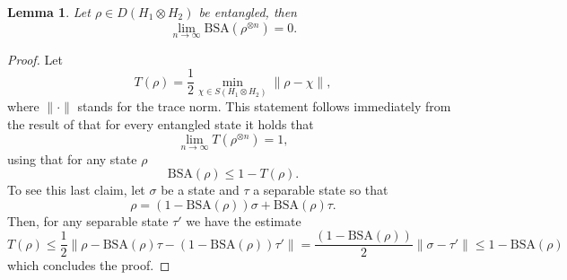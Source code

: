 \documentclass[a4paper,onecolumn,accepted=2024-12-14]{quantumarticle}
\newtheorem{lemma}[theorem]{Lemma}
\theoremstyle{plain}
\begin{document}
\begin{lemma}\label{lem:tensor-bsa}
Let $\rho\in D(H_1\otimes H_2)$ be entangled, then
\begin{equation}
\lim_{n\to\infty}\mathrm{BSA}\left(\rho^{\otimes n}\right)=0.
\end{equation}
\end{lemma}
\begin{proof}
Let
\begin{equation}
T(\rho)=\frac{1}{2}\min_{\chi\in S(H_1\otimes H_2)}\|\rho-\chi\|,
\end{equation}
where $\|\cdot\|$ stands for the trace norm. This statement follows immediately from the result of \cite{beigi} that for every entangled state it holds that
\begin{equation}
\lim_{n\to\infty}T\left(\rho^{\otimes n}\right)=1,
\end{equation}
using that for any state $\rho$
\begin{equation}\label{bsadistance}
\mathrm{BSA}(\rho)\leq1-T(\rho).
\end{equation}
To see this last claim, let $\sigma$ be a state and $\tau$ a separable state so that
\begin{equation}
\rho=(1-\mathrm{BSA}(\rho))\sigma+\mathrm{BSA}(\rho)\tau.
\end{equation}
Then, for any separable state $\tau'$ we have the estimate
\begin{equation}
T(\rho)\leq\frac{1}{2}\|\rho-\mathrm{BSA}(\rho)\tau-(1-\mathrm{BSA}(\rho))\tau'\|
      =\frac{(1-\mathrm{BSA}(\rho))}{2}\|\sigma-\tau'\|\leq 1-\mathrm{BSA}(\rho)
\end{equation}
which concludes the proof.
\end{proof}
\end{document}
